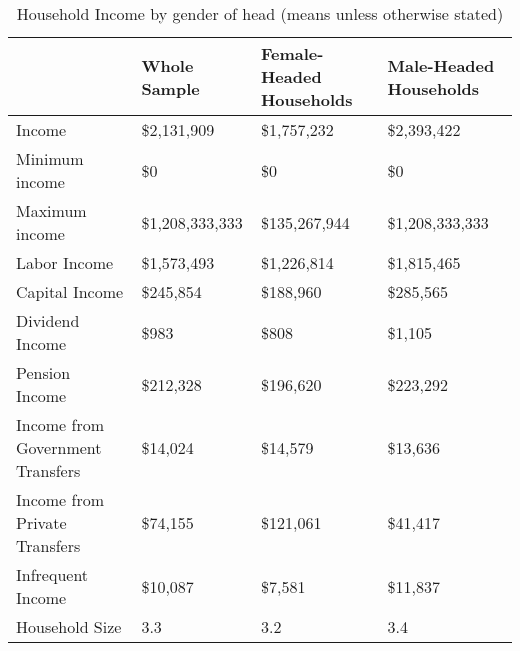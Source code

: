 \documentclass[12pt]{article}
\begin{document}
\begin{table}[]
\caption{Household Income by gender of head (means unless otherwise stated)}
\label{tab:ygender}
\footnotesize
\begin{tabular}{llll}\hline
&Whole Sample                     & Female-Headed Households & Male-Headed Households                 \\ \hline
Income                           & \$2,131,909              & \$1,757,232            & \$2,393,422     \\
Minimum income                   & \$0                      & \$0                    & \$0             \\
Maximum income                   & \$1,208,333,333          & \$135,267,944          & \$1,208,333,333 \\
Labor Income                     & \$1,573,493              & \$1,226,814            & \$1,815,465     \\
Capital Income                   & \$245,854                & \$188,960              & \$285,565       \\
Dividend Income                  & \$983                    & \$808                  & \$1,105         \\
Pension Income                   & \$212,328                & \$196,620              & \$223,292       \\
Income from Government Transfers & \$14,024                 & \$14,579               & \$13,636        \\
Income from Private Transfers    & \$74,155                 & \$121,061              & \$41,417        \\
Infrequent Income                & \$10,087                 & \$7,581                & \$11,837        \\
Household Size                   & 3.3                      & 3.2                    & 3.4            \\ \hline
\end{tabular}
\end{table}
\end{document}
